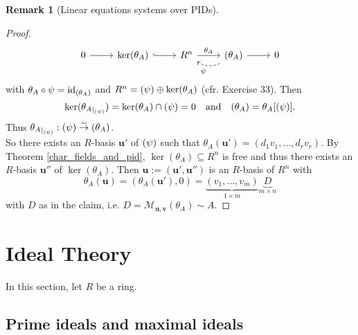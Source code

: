 \documentclass[12pt,a4paper]{report}
\theoremstyle{definition}
\newtheorem{Remark}[theorem]{Remark}
\theoremstyle{num.custom-title}
\DeclareMathOperator{\id}{id}
\let\o\relax %
\DeclareMathOperator{\o}{\mathsf{o}}
\let\Im\relax %
\DeclareMathOperator{\Im}{Im}
\DeclareMathOperator{\sse}{\subseteq}
\newcommand{\M}{\mathcal{M}}
\begin{document}
\begin{Remark}[Linear equations systems over PIDs]
\begin{proof}
\[
\begin{tikzcd}
0 \arrow{r} & \ker(\theta_A) \arrow[hookrightarrow]{r} & R^n \arrow{r}{\theta_A} & \Im(\theta_A) \arrow{r}{} \arrow[dashrightarrow, bend left]{l}{\psi} & 0
\end{tikzcd}
\]
with $\theta_A \circ \psi = \id_{\Im(\theta_A)}$ and $R^n = \Im(\psi) \oplus \ker(\theta_A)$ (cfr. Exercise 33). Then
\[
\ker({\theta_A}_{|_{\Im(\psi)}}) = \ker(\theta_A) \cap \Im(\psi)=0 \quad \text{and} \quad \Im(\theta_A) = \theta_A[\Im(\psi)].
\]
Thus ${\theta_A}_{|_{\Im(\psi)}} : \Im(\psi) \stackrel{\sim}{\to} \Im(\theta_A)$.\\
So there exists an $R$-basis $\mathbf{u}'$ of $\Im(\psi)$ such that $\theta_A(\mathbf{u}') = (d_1 v_1,...,d_r v_r)$. By Theorem \ref{char_fields_and_pid}, $\ker(\theta_A) \sse R^n$ is free and thus there exists an $R$-basis $\mathbf{u}''$ of $\ker(\theta_A)$. Then $\mathbf{u} := (\mathbf{u}',\mathbf{u}'')$ is an $R$-basis of $R^n$ with
\[
\theta_A(\mathbf{u}) = (\theta_A(\mathbf{u}'),0) = \underbrace{(v_1,\ldots,v_m)}_{1 \times m} \underbrace{D}_{m \times n}
\]
with $D$ as in the claim, i.e. $D = \M_{\mathbf{u},\mathbf{v}}(\theta_A) \sim A$.
\end{proof}
\end{Remark}






\chapter{Ideal Theory}

In this section, let $R$ be a ring.

\section{Prime ideals and maximal ideals}
\end{document}
